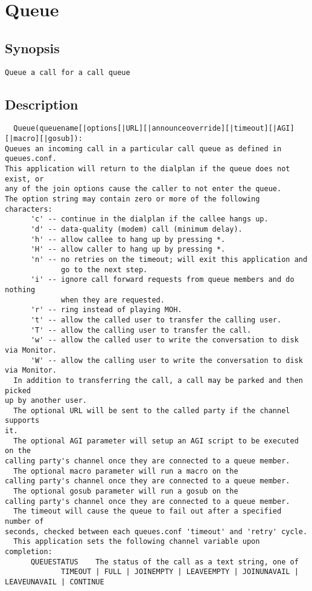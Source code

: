 \section{Queue}
\subsection{Synopsis}
\begin{verbatim}
Queue a call for a call queue
\end{verbatim}
\subsection{Description}
\begin{verbatim}
  Queue(queuename[|options[|URL][|announceoverride][|timeout][|AGI][|macro][|gosub]):
Queues an incoming call in a particular call queue as defined in queues.conf.
This application will return to the dialplan if the queue does not exist, or
any of the join options cause the caller to not enter the queue.
The option string may contain zero or more of the following characters:
      'c' -- continue in the dialplan if the callee hangs up.
      'd' -- data-quality (modem) call (minimum delay).
      'h' -- allow callee to hang up by pressing *.
      'H' -- allow caller to hang up by pressing *.
      'n' -- no retries on the timeout; will exit this application and 
             go to the next step.
      'i' -- ignore call forward requests from queue members and do nothing
             when they are requested.
      'r' -- ring instead of playing MOH.
      't' -- allow the called user to transfer the calling user.
      'T' -- allow the calling user to transfer the call.
      'w' -- allow the called user to write the conversation to disk via Monitor.
      'W' -- allow the calling user to write the conversation to disk via Monitor.
  In addition to transferring the call, a call may be parked and then picked
up by another user.
  The optional URL will be sent to the called party if the channel supports
it.
  The optional AGI parameter will setup an AGI script to be executed on the 
calling party's channel once they are connected to a queue member.
  The optional macro parameter will run a macro on the 
calling party's channel once they are connected to a queue member.
  The optional gosub parameter will run a gosub on the 
calling party's channel once they are connected to a queue member.
  The timeout will cause the queue to fail out after a specified number of
seconds, checked between each queues.conf 'timeout' and 'retry' cycle.
  This application sets the following channel variable upon completion:
      QUEUESTATUS    The status of the call as a text string, one of
             TIMEOUT | FULL | JOINEMPTY | LEAVEEMPTY | JOINUNAVAIL | LEAVEUNAVAIL | CONTINUE

\end{verbatim}


